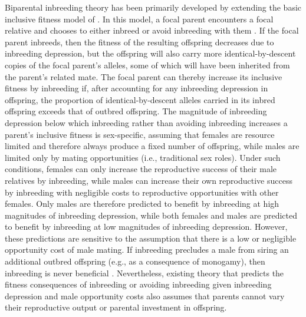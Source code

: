 \documentclass[12pt]{article}
\begin{document}
Biparental inbreeding theory has been primarily developed by extending the basic inclusive fitness model of \cite{Parker1979}. In this model, a focal parent encounters a focal relative and chooses to either inbreed or avoid inbreeding with them \cite[e.g.,][]{Parker1979, Parker2006, Kokko2006, Duthie2015a}. If the focal parent inbreeds, then the fitness of the resulting offspring decreases due to inbreeding depression, but the offspring will also carry more identical-by-descent copies of the focal parent's alleles, some of which will have been inherited from the parent's related mate. The focal parent can thereby increase its inclusive fitness by inbreeding if, after accounting for any inbreeding depression in offspring, the proportion of identical-by-descent alleles carried in its inbred offspring exceeds that of outbred offspring. The magnitude of inbreeding depression below which inbreeding rather than avoiding inbreeding increases a parent's inclusive fitness is sex-specific, assuming that females are resource limited and therefore always produce a fixed number of offspring, while males are limited only by mating opportunities (i.e., traditional sex roles). Under such conditions, females can only increase the reproductive success of their male relatives by inbreeding, while males can increase their own reproductive success by inbreeding with negligible costs to reproductive opportunities with other females. Only males are therefore predicted to benefit by inbreeding at high magnitudes of inbreeding depression, while both females and males are predicted to benefit by inbreeding at low magnitudes of inbreeding depression. However, these predictions are sensitive to the assumption that there is a low or negligible opportunity cost of male mating. If inbreeding precludes a male from siring an additional outbred offspring (e.g., as a consequence of monogamy), then inbreeding is never beneficial \cite[][]{Waser1986}. Nevertheless, existing theory that predicts the fitness consequences of inbreeding or avoiding inbreeding given inbreeding depression and male opportunity costs also assumes that parents cannot vary their reproductive output or parental investment in offspring.  
\end{document}
